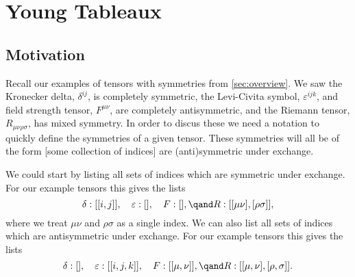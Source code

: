 \documentclass[fleqn]{NotesClass}
\begin{document}
    \chapter{Young Tableaux}
    \section{Motivation}
    Recall our examples of tensors with symmetries from \cref{sec:overview}.
    We saw the Kronecker delta, \(\delta^{ij}\), is completely symmetric, the Levi-Civita symbol, \(\varepsilon^{ijk}\), and field strength tensor, \(F^{\mu\nu}\), are completely antisymmetric, and the Riemann tensor, \(R_{\mu\nu\rho\sigma}\), has mixed symmetry.
    In order to discus these we need a notation to quickly define the symmetries of a given tensor.
    These symmetries will all be of the form [some collection of indices] are (anti)symmetric under exchange.
    
    We could start by listing all sets of indices which are symmetric under exchange.
    For our example tensors this gives the lists
    \begin{equation}
        \delta: [[i, j]], \quad \varepsilon: [], \quad F: [], \qand R: [[\mu\nu], [\rho\sigma]],
    \end{equation}
    where we treat \(\mu\nu\) and \(\rho\sigma\) as a single index.
    We can also list all sets of indices which are antisymmetric under exchange.
    For our example tensors this gives the lists
    \begin{equation}
        \delta: [], \quad \varepsilon: [[i, j, k]], \quad F: [[\mu, \nu]], \qand R: [[\mu, \nu], [\rho, \sigma]].
    \end{equation}
    
\end{document}
